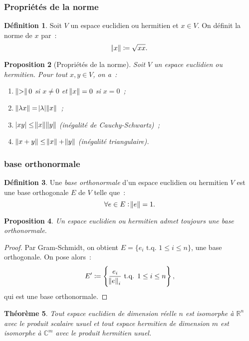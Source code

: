 \documentclass{article}
\newcommand{\R}{\mathbb R}
\newcommand{\C}{\mathbb C}
\newcommand{\tq}{\textrm{ t.q. }}
\newtheorem{thm}{Théorème}[section]
\newtheorem{prp}[thm]{Proposition}
\theoremstyle{definition}
\newtheorem{déf}[thm]{Définition}
\theoremstyle{remark}
\begin{document}
		\subsubsection{Propriétés de la norme}
		\begin{déf} Soit $V$ un espace euclidien ou hermitien et $x \in V$. On définit la norme de $x$ par~:
		\[\norm x \coloneqq \sqrt {xx}.\]
		\end{déf}

		\begin{prp}[Propriétés de la norme] Soit $V$ un espace euclidien ou hermitien. Pour tout $x, y \in V$, on a~:
		\begin{enumerate}
			\item $\norm > 0$ si $x \neq 0$ et $\norm x = 0$ si $x = 0$~;
			\item $\norm {\lambda x} = \abs \lambda\norm x$~;
			\item $\abs {xy} \leq \norm x\norm y$ (inégalité de Cauchy-Schwartz)~;
			\item $\norm {x+y} \leq \norm x + \norm y$ (inégalité triangulaire).
		\end{enumerate}
		\end{prp}

		\subsubsection{base orthonormale}
		\begin{déf} Une \emph{base orthonormale} d'un espace euclidien ou hermitien $V$ est une base orthogonale $E$ de $V$ telle que~:
		\[\forall e \in E : \norm e = 1.\]
		\end{déf}

		\begin{prp} Un espace euclidien ou hermitien admet toujours une \emph{base orthonormale}.
		\end{prp}

		\begin{proof} Par Gram-Schmidt, on obtient $E = \{e_i \tq 1 \leq i \leq n\}$, une base orthogonale. On pose alors~:
		\[E' \coloneqq \left\{\frac {e_i}{\norm e_i} \tq 1 \leq i \leq n\right\},\]
		qui est une base orthonormale.
		\end{proof}

		\begin{thm} Tout espace euclidien de dimension réelle $n$ est isomorphe à $\R^n$ avec le produit scalaire usuel et tout espace hermitien de dimension
		$m$ est isomorphe à $\C^m$ avec le produit hermitien usuel.
		\end{thm}
\end{document}
